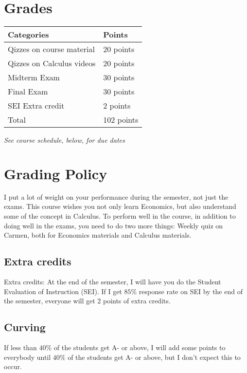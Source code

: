 \documentclass[12pt]{article}
\begin{document}
\newpage

\section*{Grades}

\newlength\q
\setlength{}
\begin{tabular}{|p{\q}|p{\q}|}
    \hline
    Categories  & Points \\
    \hline
    \hline
    Qizzes on course material   & 20 points \\
    \hline
    Qizzes on Calculus videos & 20 points \\
    \hline
    Midterm Exam & 30 points \\
    \hline
    Final Exam & 30 points \\
    \hline
    SEI Extra credit & 2 points \\
    \hline
    Total & 102 points \\
    \hline
\end{tabular}
\textit{See course schedule, below, for due dates}


\section*{Grading Policy}

I put a lot of weight on your performance during the semester, not just the exams.
This course wishes you not only learn Economics, but also understand some of the concept in Calculus.
To perform well in the course, in addition to doing well in the exams, you need to do two more things: Weekly quiz on Carmen, both for Economics materials and Calculus materials.

\subsection*{Extra credits}

Extra credits: At the end of the semester, I will have you do the Student Evaluation of Instruction (SEI). If I get $85\%$ response rate on SEI by the end of the semester, everyone will get 2 points of extra credits.

\subsection*{Curving}

If less than $40\%$ of the students get A- or above, I will add some points to everybody until $40\%$ of the students get A- or above, but I don’t expect this to occur.
\end{document}
